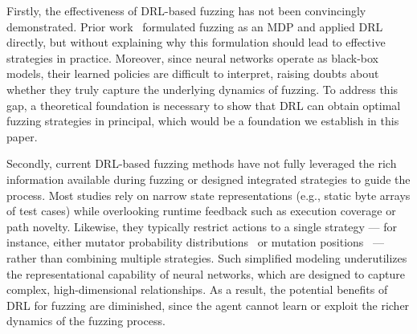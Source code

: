 \documentclass[lettersize,journal]{IEEEtran}
\begin{document}
Firstly, the effectiveness of DRL-based fuzzing has not been convincingly demonstrated. Prior work~\cite{bottingerDeepReinforcementFuzzing2018} formulated fuzzing as an MDP and applied DRL directly, but without explaining why this formulation should lead to effective strategies in practice. Moreover, since neural networks operate as black-box models, their learned policies are difficult to interpret, raising doubts about whether they truly capture the underlying dynamics of fuzzing. To address this gap, a theoretical foundation is necessary to show that DRL can obtain optimal fuzzing strategies in principal, which would be a foundation we establish in this paper.

Secondly, current DRL-based fuzzing methods have not fully leveraged the rich information available during fuzzing or designed integrated strategies to guide the process. Most studies rely on narrow state representations (e.g., static byte arrays of test cases) while overlooking runtime feedback such as execution coverage or path novelty. Likewise, they typically restrict actions to a single strategy — for instance, either mutator probability distributions~\cite{bottingerDeepReinforcementFuzzing2018,gongDRLFCfuzzerFuzzingDeepReinforcementLearning2022} or mutation positions~\cite{binosiRainfuzzReinforcementlearningDriven2023} — rather than combining multiple strategies. Such simplified modeling underutilizes the representational capability of neural networks, which are designed to capture complex, high-dimensional relationships. As a result, the potential benefits of DRL for fuzzing are diminished, since the agent cannot learn or exploit the richer dynamics of the fuzzing process.
\end{document}
